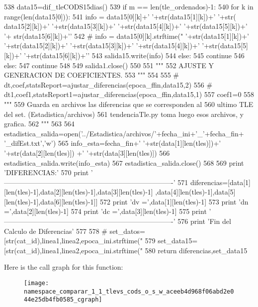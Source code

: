 \begin{DoxyCode}
538                 data15=dif_tleCODS15dias()
539                 if m == len(tle_ordenados)-1:
540                     for k in range(len(data15[0])):
541                         info = data15[0][k]+' '+str(data15[1][k])+' '+str(
      data15[2][k])+' '+str(data15[3][k])+' '+str(data15[4][k])+' '+str(data15[5][k])+' '+
      str(data15[6][k])+'\n'
542                        # info = data15[0][k].strftime("%
       '+str(data15[1][k])+' '+str(data15[2][k])+' '+str(data15[3][k])+'
       '+str(data15[4][k])+' '+str(data15[5][k])+' '+str(data15[6][k])+'\n'
543                         salida15.write(info)
544             else:
545                 continue 
546         else:
547             continue  
548         
549     salida1.close()
550     
551     """
552     AJUSTE Y GENERACION DE COEFICIENTES.
553     """
554     
555 #     dt,coef,statsReport=ajustar_diferencias(epoca_ffin,data15,2)
556 #     dt1,coef1,statsReport1=ajustar_diferencias(epoca_ffin,data15,1)
557     coef1=0
558     """
559     Guarda en archivos las diferencias que se corresponden al
560     ultimo TLE del set. (Estadistica/archivos)
561     tendenciaTle.py toma luego esos archivos, y grafica.
562     """
563 
564     estadistica_salida=open('../Estadistica/archivos/'+fecha_ini+'_'+fecha_fin+
      '_difEst.txt','w')
565     info_esta=fecha_fin+' '+str(data[1][len(tles)])+' '+str(data[2][len(tles)])
      +' '+str(data[3][len(tles)])
566     estadistica_salida.write(info_esta)
567     estadistica_salida.close()
568     
569     print 'DIFERENCIAS:'
570     print '
      -------------------------------------------------------------------------'
571     diferencias=[data[1][len(tles)-1],data[2][len(tles)-1],data[3][len(tles)-1]
      ,data[4][len(tles)-1],data[5][len(tles)-1],data[6][len(tles)-1]]
572     print 'dv =',data[1][len(tles)-1]
573     print 'dn =',data[2][len(tles)-1]
574     print 'dc =',data[3][len(tles)-1]
575     print '
      -------------------------------------------------------------------------'
576     print 'Fin del Calculo de Diferencias'
577 
578 #    set_datos=[str(cat_id),linea1,linea2,epoca_ini.strftime("%
579     set_data15=[str(cat_id),linea1,linea2,epoca_ini.strftime("%
580     return diferencias,set_data15

\end{DoxyCode}


\-Here is the call graph for this function\-:\nopagebreak
\begin{figure}[H]
\begin{center}
\leavevmode
\texttt{[image: namespace\_comparar\_1\_1\_tlevs\_cods\_o\_s\_w\_aceeb4d968f06abd2e044e25db4fb0585\_cgraph]}
\end{center}
\end{figure}


